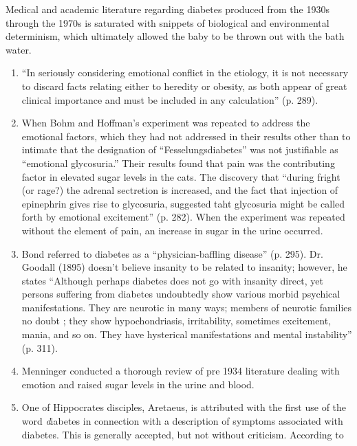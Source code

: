 \documentclass[12pt]{article}
\begin{document}
Medical and academic literature regarding diabetes produced from the 1930s through the 1970s is saturated with snippets of biological and environmental determinism, which ultimately allowed the baby to be thrown out with the bath water.  

\begin{enumerate}
\item \citep{daniels_role_1948}
``In seriously considering emotional conflict in the etiology, it is not necessary to discard facts relating either to heredity or obesity, as both appear of great clinical importance and must be included in any calculation'' (p. 289). 
\item \citep{cannon_1916_bodily}
When Bohm and Hoffman's experiment was repeated to address the emotional factors, which they had not addressed in their results other than to intimate that the designation of ``Fesselungsdiabetes'' was not justifiable as ``emotional glycosuria.'' Their results found that pain was the contributing factor in elevated sugar levels in the cats. The discovery that ``during fright (or rage?) the adrenal sectretion is increased, and the fact that injection of epinephrin gives rise to glycosuria, suggested taht glycosuria might be called forth by emotional excitement'' (p. 282). When the experiment was repeated without the element of pain, an increase in sugar in the urine occurred. 

\item \citep{bond_1895_relation}
Bond referred to diabetes as a ``physician-baffling disease'' (p. 295).
Dr. Goodall (1895) doesn't believe insanity to be related to insanity; however, he states ``Although perhaps diabetes does not go with insanity direct, yet persons suffering from diabetes undoubtedly show
various morbid psychical manifestations. They are neurotic in many ways; members of neurotic families no doubt ; they show hypochondriasis, irritability, sometimes excitement, mania, and so on. They have hysterical manifestations and mental instability'' (p. 311). 

\item \citep{menninger_1935_psychological} Menninger conducted a thorough review of pre 1934 literature dealing with emotion and raised sugar levels in the urine and blood. 

\item \citep{major_1933_classic}
One of Hippocrates disciples, Aretaeus, is attributed with the first use of the word \textit diabetes in connection with a description of symptoms associated with diabetes. This is generally accepted, but not without criticism. According to



\end{enumerate}
\end{document}
